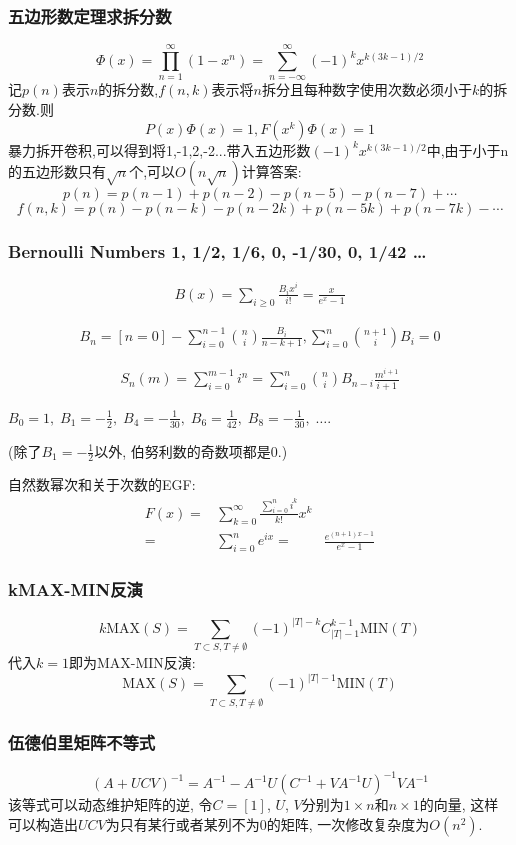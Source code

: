 \begin{small}
\subsubsection{五边形数定理求拆分数}
\[ \Phi(x) = \prod_{n=1}^{\infty}(1-x^n) = \sum_{n=-\infty}^{\infty}{(-1)^kx^{k(3k-1)/2}} \]
记$p(n)$表示$n$的拆分数,$f(n,k)$表示将$n$拆分且每种数字使用次数必须小于$k$的拆分数.则
\[ P(x)\Phi(x)=1, F(x^k)\Phi(x)=1\]
暴力拆开卷积,可以得到将1,-1,2,-2...带入五边形数$(-1)^kx^{k(3k-1)/2}$中,由于小于n的五边形数只有$\sqrt{n}$个,可以$O(n\sqrt{n})$计算答案:
\[ p(n) = p(n-1)+p(n-2)-p(n-5)-p(n-7)+\cdots \]
\[ f(n, k) = p(n)-p(n-k)-p(n-2k)+p(n-5k)+p(n-7k)-\cdots \]
\subsubsection{Bernoulli Numbers 1, 1/2, 1/6, 0, -1/30, 0, 1/42 \dots}

$$\begin{aligned}B(x)=\sum_{i\ge 0}\frac{B_i x^i}{i!}=\frac x{e^x-1}\end{aligned}$$

$$ \begin{aligned}B_n=[n=0]-\sum_{i=0}^{n-1}{n\choose i}\frac{B_i}{n-k+1}, \sum_{i=0}^n{n+1\choose i}B_i=0\end{aligned} $$

$$ \begin{aligned}S_n(m)=\sum_{i=0}^{m-1}i^n=\sum_{i=0}^n{n\choose i}B_{n-i}\frac{m^{i+1}}{i+1}\end{aligned} $$

$ B_0 = 1,\; B_1 = -\frac 1 2,\; B_4 = -\frac 1 {30},\; B_6 = \frac 1 {42},\; B_8 = -\frac 1{30},\; \dots$.

(除了$B_1 = -\frac 1 2$以外, 伯努利数的奇数项都是$0$.)

自然数幂次和关于次数的EGF:
$$ \begin{aligned} F(x)=&\sum_{k=0}^\infty \frac{\sum_{i=0}^n i^k}{k!}x^k\\ =&\sum_{i=0}^n e^{ix} =&\frac{e^{(n+1)x-1}}{e^x-1} \end{aligned} $$

\subsubsection{kMAX-MIN反演}
\[k \mathrm{MAX}(S)=\sum_{T\subset S, T\neq \emptyset}(-1)^{|T|-k}C_{|T|-1}^{k-1}\mathrm{MIN}(T)\]
代入$k=1$即为MAX-MIN反演:
\[\mathrm{MAX}(S)=\sum_{T\subset S, T\neq \emptyset}(-1)^{|T|-1}\mathrm{MIN}(T)\]
\subsubsection{伍德伯里矩阵不等式}
$$(A+UCV)^{-1}=A^{-1}-A^{-1}U(C^{-1}+VA^{-1}U)^{-1}VA^{-1}$$
该等式可以动态维护矩阵的逆, 令$C=[1]$, $U$, $V$分别为$1\times n$和$n\times 1$的向量, 这样可以构造出$UCV$为只有某行或者某列不为0的矩阵, 一次修改复杂度为$O(n^2)$.

\end{small}
